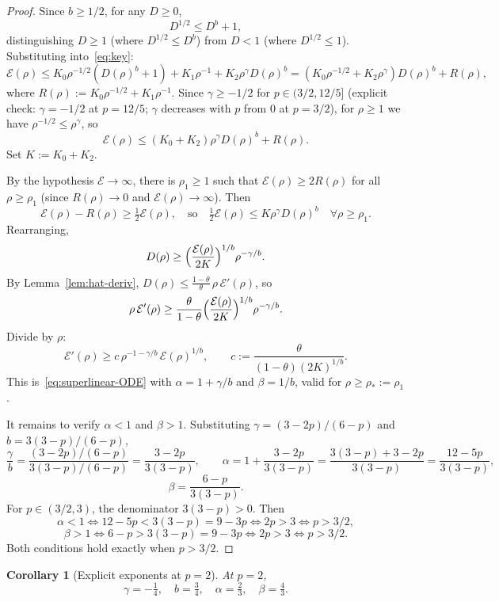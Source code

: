\documentclass[11pt]{amsart}
\newtheorem{corollary}[theorem]{Corollary}
\theoremstyle{definition}
\newcommand{\EE}{\mathcal{E}}    %
\newcommand{\DD}{D}              %
\begin{document}
\begin{proof}
Since $b \geq 1/2$, for any $\DD \geq 0$,
\[
\DD^{1/2} \leq \DD^b + 1,
\]
distinguishing $\DD \geq 1$ (where $\DD^{1/2} \leq \DD^b$) from
$\DD < 1$ (where $\DD^{1/2} \leq 1$). Substituting
into~\eqref{eq:key}:
\begin{equation}\label{eq:key2}
\EE(\rho) \leq K_0\rho^{-1/2}(\DD(\rho)^b + 1)
+ K_1\rho^{-1}
+ K_2\rho^\gamma\DD(\rho)^b
= (K_0\rho^{-1/2} + K_2\rho^\gamma)\DD(\rho)^b + R(\rho),
\end{equation}
where $R(\rho) := K_0\rho^{-1/2} + K_1\rho^{-1}$. Since
$\gamma \geq -1/2$ for $p \in (3/2, 12/5]$ (explicit check:
$\gamma = -1/2$ at $p = 12/5$; $\gamma$ decreases with $p$
from 0 at $p = 3/2$), for $\rho \geq 1$ we have
$\rho^{-1/2} \leq \rho^\gamma$, so
\[
\EE(\rho) \leq (K_0 + K_2)\rho^\gamma \DD(\rho)^b + R(\rho).
\]
Set $K := K_0 + K_2$.

By the hypothesis $\EE \to \infty$, there is $\rho_1 \geq 1$
such that $\EE(\rho) \geq 2R(\rho)$ for all $\rho \geq \rho_1$
(since $R(\rho) \to 0$ and $\EE(\rho) \to \infty$). Then
\[
\EE(\rho) - R(\rho) \geq \tfrac{1}{2}\EE(\rho),
\quad\text{so}\quad
\tfrac{1}{2}\EE(\rho) \leq K\rho^\gamma \DD(\rho)^b
\quad\forall \rho \geq \rho_1.
\]
Rearranging,
\[
\DD(\rho) \geq \Bigl(\frac{\EE(\rho)}{2K}\Bigr)^{1/b}
\rho^{-\gamma/b}.
\]
By Lemma~\ref{lem:hat-deriv},
$\DD(\rho) \leq \frac{1-\theta}{\theta}\,\rho\,\EE'(\rho)$, so
\[
\rho\,\EE'(\rho) \geq \frac{\theta}{1 - \theta}
\Bigl(\frac{\EE(\rho)}{2K}\Bigr)^{1/b} \rho^{-\gamma/b}.
\]
Divide by $\rho$:
\[
\EE'(\rho) \geq c\,\rho^{-1-\gamma/b}\,\EE(\rho)^{1/b},
\qquad c := \frac{\theta}{(1-\theta)(2K)^{1/b}}.
\]
This is~\eqref{eq:superlinear-ODE} with $\alpha = 1 + \gamma/b$
and $\beta = 1/b$, valid for $\rho \geq \rho_* := \rho_1$.

It remains to verify $\alpha < 1$ and $\beta > 1$. Substituting
$\gamma = (3-2p)/(6-p)$ and $b = 3(3-p)/(6-p)$,
\[
\frac{\gamma}{b}
= \frac{(3-2p)/(6-p)}{3(3-p)/(6-p)}
= \frac{3 - 2p}{3(3 - p)},
\qquad
\alpha = 1 + \frac{3 - 2p}{3(3-p)}
= \frac{3(3-p) + 3 - 2p}{3(3-p)}
= \frac{12 - 5p}{3(3 - p)},
\]
\[
\beta = \frac{6 - p}{3(3 - p)}.
\]
For $p \in (3/2, 3)$, the denominator $3(3 - p) > 0$. Then
\[
\alpha < 1 \iff 12 - 5p < 3(3 - p) = 9 - 3p \iff 2p > 3 \iff p > 3/2,
\]
\[
\beta > 1 \iff 6 - p > 3(3 - p) = 9 - 3p \iff 2p > 3 \iff p > 3/2.
\]
Both conditions hold exactly when $p > 3/2$.
\end{proof}

\begin{corollary}[Explicit exponents at $p = 2$]\label{cor:p2-expo}
At $p = 2$,
\[
\gamma = -\tfrac{1}{4}, \quad b = \tfrac{3}{4},
\quad \alpha = \tfrac{2}{3}, \quad \beta = \tfrac{4}{3}.
\]
\end{corollary}
\end{document}
